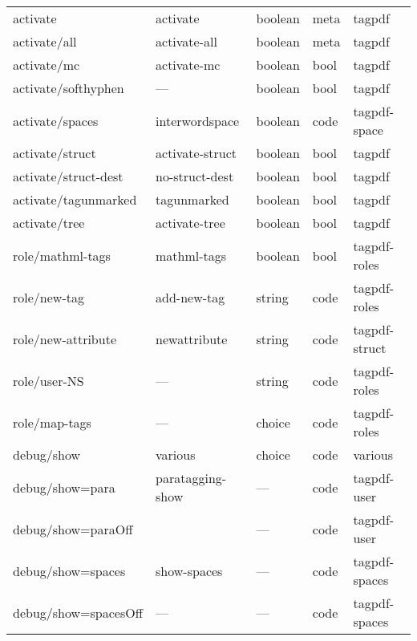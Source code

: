 \begin{tabular}{lllll}
activate        & activate        & boolean         &meta  & tagpdf \\
activate/all    & activate-all    & boolean         &meta & tagpdf\\
activate/mc     & activate-mc     & boolean         &bool  & tagpdf\\
activate/softhyphen & ---         & boolean         &bool  & tagpdf \\    
activate/spaces & interwordspace  & boolean         &code  & tagpdf-space\\
activate/struct & activate-struct & boolean         &bool  & tagpdf\\  
activate/struct-dest & no-struct-dest&boolean       &bool  & tagpdf\\
activate/tagunmarked& tagunmarked & boolean         &bool & tagpdf\\
activate/tree   & activate-tree   & boolean         &bool  & tagpdf\\[4pt]\midrule  
role/mathml-tags & mathml-tags    & boolean          &bool  & tagpdf-roles\\
role/new-tag     & add-new-tag    & string           &code  & tagpdf-roles\\
role/new-attribute&newattribute   & string           &code  & tagpdf-struct\\
role/user-NS     & ---            & string           &code  & tagpdf-roles\\ 
role/map-tags      & ---            & choice           & code & tagpdf-roles\\[4pt]\midrule
debug/show       &various          &choice            &code  & various \\ 
debug/show=para  & paratagging-show&    ---           &code  & tagpdf-user\\
debug/show=paraOff&                &    ---           &code  & tagpdf-user\\
debug/show=spaces & show-spaces    &    ---           &code  & tagpdf-spaces\\
debug/show=spacesOff& ---          &    ---           &code  & tagpdf-spaces\\

\end{tabular}

